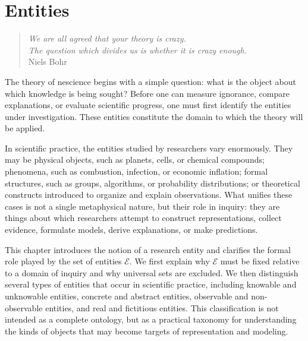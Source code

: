 %
%


\chapter{Entities}
\label{chap:Entities}

\begin{quote}
\begin{flushright}
\emph{We are all agreed that your theory is crazy. \\
The question which divides us is whether it is crazy enough.} \\
Niels Bohr
\end{flushright}
\end{quote}
\bigskip

The theory of nescience begins with a simple question: what is the object about which knowledge is being sought? Before one can measure ignorance, compare explanations, or evaluate scientific progress, one must first identify the entities under investigation. These entities constitute the domain to which the theory will be applied.

In scientific practice, the entities studied by researchers vary enormously. They may be physical objects, such as planets, cells, or chemical compounds; phenomena, such as combustion, infection, or economic inflation; formal structures, such as groups, algorithms, or probability distributions; or theoretical constructs introduced to organize and explain observations. What unifies these cases is not a single metaphysical nature, but their role in inquiry: they are things about which researchers attempt to construct representations, collect evidence, formulate models, derive explanations, or make predictions.

This chapter introduces the notion of a research entity and clarifies the formal role played by the set of entities $\mathcal{E}$. We first explain why $\mathcal{E}$ must be fixed relative to a domain of inquiry and why universal sets are excluded. We then distinguish several types of entities that occur in scientific practice, including knowable and unknowable entities, concrete and abstract entities, observable and non-observable entities, and real and fictitious entities. This classification is not intended as a complete ontology, but as a practical taxonomy for understanding the kinds of objects that may become targets of representation and modeling.

